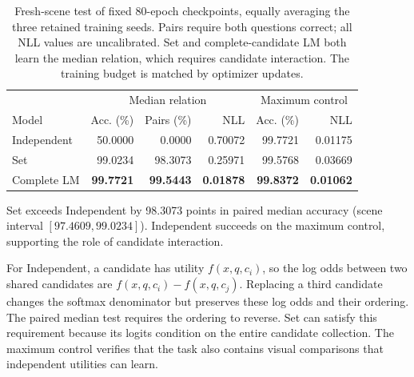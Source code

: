 \begin{table}[htbp]
\centering\small
\begin{tabular}{lrrrrr}
\toprule
& \multicolumn{3}{c}{Median relation} & \multicolumn{2}{c}{Maximum control} \\
Model & Acc. (\%) & Pairs (\%) & NLL & Acc. (\%) & NLL \\
\midrule
Independent & 50.0000 & 0.0000 & 0.70072 & 99.7721 & 0.01175 \\
Set & 99.0234 & 98.3073 & 0.25971 & 99.5768 & 0.03669 \\
Complete LM & \textbf{99.7721} & \textbf{99.5443} & \textbf{0.01878} & \textbf{99.8372} & \textbf{0.01062} \\
\bottomrule
\end{tabular}
\caption{Fresh-scene test of fixed 80-epoch checkpoints, equally averaging the three retained training seeds. Pairs require both questions correct; all NLL values are uncalibrated. Set and complete-candidate LM both learn the median relation, which requires candidate interaction. The training budget is matched by optimizer updates.}
\label{tab:relation-duration-fresh}
\end{table}

Set exceeds Independent by 98.3073 points in paired median accuracy (scene interval $[97.4609,99.0234]$). Independent succeeds on the maximum control, supporting the role of candidate interaction.

For Independent, a candidate has utility $f(x,q,c_i)$, so the log odds between two shared candidates are $f(x,q,c_i)-f(x,q,c_j)$. Replacing a third candidate changes the softmax denominator but preserves these log odds and their ordering. The paired median test requires the ordering to reverse. Set can satisfy this requirement because its logits condition on the entire candidate collection. The maximum control verifies that the task also contains visual comparisons that independent utilities can learn.

